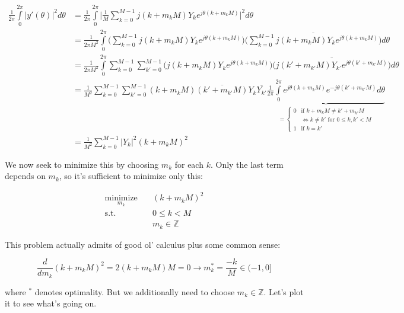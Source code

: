 \documentclass[10pt]{article}
\begin{document}
\begin{align*}
\frac{1}{2\pi} \int\limits_{0}^{2\pi} |y'(\theta)|^2 d\theta &= \frac{1}{2\pi} \int\limits_{0}^{2\pi} \Big|\frac{1}{M} \sum_{k=0}^{M-1} j(k + m_k M) Y_k e^{j \theta (k + m_k M)} \Big|^2 d\theta \\
&= \frac{1}{2\pi M^2} \int\limits_{0}^{2\pi} \Big( \sum_{k=0}^{M-1} j(k + m_k M) Y_k e^{j \theta (k + m_k M)} \Big) \overline{\Big( \sum_{k=0}^{M-1} j(k + m_k M) Y_k e^{j \theta (k + m_k M)} \Big)} d\theta \\
&= \frac{1}{2\pi M^2} \int\limits_{0}^{2\pi} \sum_{k=0}^{M-1} \sum_{k'=0}^{M-1} \Big( j(k + m_k M) Y_k e^{j \theta (k + m_k M)} \Big) \overline{\Big( j(k' + m_{k'} M) Y_{k'} e^{j \theta (k' + m_{k'} M)} \Big)} d\theta \\
&= \frac{1}{M^2} \sum_{k=0}^{M-1} \sum_{k'=0}^{M-1} (k + m_k M) \overline{(k' + m_{k'} M)} Y_k \overline{Y_{k'}} \underbrace{\frac{1}{2\pi} \int\limits_{0}^{2\pi} e^{j \theta (k + m_k M)} e^{-j \theta (k' + m_{k'} M)} d\theta}_{= \begin{cases} 0 & \text{if } k + m_k M \neq k' + m_{k'} M \\ & \iff k \neq k' \text{ for } 0 \leq k, k' < M \\ 1 & \text{if } k = k'\end{cases}} \\
&= \frac{1}{M^2} \sum_{k=0}^{M-1} |Y_k|^2 (k + m_k M)^2
\end{align*}

We now seek to minimize this by choosing $m_k$ for each $k$. Only the last term depends on $m_k$, so it's sufficient to minimize only this:\vspace{-5mm}

\begin{align*}
\underset{m_k}{\text{minimize}} \quad & (k + m_k M)^2 \\
\text{s.t.} \quad & 0 \leq k < M \\
	& m_k \in \mathbb{Z}
\end{align*}

This problem actually admits of good ol' calculus plus some common sense:

$$\frac{d}{dm_k} (k + m_k M)^2 = 2(k + m_k M)M = 0 \longrightarrow m_k^* = \frac{-k}{M} \in (-1, 0]$$\vspace{0mm}

where $^*$ denotes optimality. But we additionally need to choose $m_k \in \mathbb{Z}$. Let's plot it to see what's going on.
\end{document}
